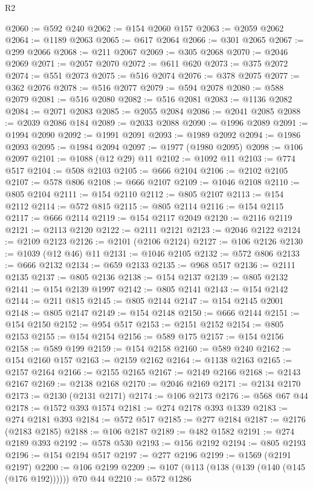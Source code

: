 \begin{lexlean}{R2}
\begin{coremodule}
@2060 := @592 @240
@2062 := @154 @2060 @157
@2063 := @2059 @2062
@2064 := @1189 @2063
@2065 := @617 @2064
@2066 := @301 @2065
@2067 := @299 @2066
@2068 := @211 @2067
@2069 := @305 @2068
@2070 := @2046 @2069
@2071 := @2057 @2070
@2072 := @611 @620
@2073 := @375 @2072
@2074 := @551 @2073
@2075 := @516 @2074
@2076 := @378 @2075
@2077 := @362 @2076
@2078 := @516 @2077
@2079 := @594 @2078
@2080 := @588 @2079
@2081 := @516 @2080
@2082 := @516 @2081
@2083 := @1136 @2082
@2084 := @2071 @2083
@2085 := @2055 @2084
@2086 := @2041 @2085
@2088 := @2039 @2086 @184
@2089 := @2033 @2088
@2090 := @1996 @2089
@2091 := @1994 @2090
@2092 := @1991 @2091
@2093 := @1989 @2092
@2094 := @1986 @2093
@2095 := @1984 @2094
@2097 := @1977 (@1980 @2095)
@2098 := @106 @2097
@2101 := @1088 (@12 @29) @11
@2102 := @1092 @11
@2103 := @774 @517
@2104 := @508 @2103
@2105 := @666 @2104
@2106 := @2102 @2105
@2107 := @578 @806
@2108 := @666 @2107
@2109 := @1046 @2108
@2110 := @805 @2104
@2111 := @154 @2110
@2112 := @805 @2107
@2113 := @154 @2112
@2114 := @572 @815
@2115 := @805 @2114
@2116 := @154 @2115
@2117 := @666 @2114
@2119 := @154 @2117 @2049
@2120 := @2116 @2119
@2121 := @2113 @2120
@2122 := @2111 @2121
@2123 := @2046 @2122
@2124 := @2109 @2123
@2126 := @2101 (@2106 @2124)
@2127 := @106 @2126
@2130 := @1039 (@12 @46) @11
@2131 := @1046 @2105
@2132 := @572 @806
@2133 := @666 @2132
@2134 := @659 @2133
@2135 := @968 @517
@2136 := @2111 @2135
@2137 := @805 @2136
@2138 := @154 @2137
@2139 := @805 @2132
@2141 := @154 @2139 @1997
@2142 := @805 @2141
@2143 := @154 @2142
@2144 := @211 @815
@2145 := @805 @2144
@2147 := @154 @2145 @2001
@2148 := @805 @2147
@2149 := @154 @2148
@2150 := @666 @2144
@2151 := @154 @2150
@2152 := @954 @517
@2153 := @2151 @2152
@2154 := @805 @2153
@2155 := @154 @2154
@2156 := @589 @175
@2157 := @154 @2156
@2158 := @589 @199
@2159 := @154 @2158
@2160 := @589 @240
@2162 := @154 @2160 @157
@2163 := @2159 @2162
@2164 := @1138 @2163
@2165 := @2157 @2164
@2166 := @2155 @2165
@2167 := @2149 @2166
@2168 := @2143 @2167
@2169 := @2138 @2168
@2170 := @2046 @2169
@2171 := @2134 @2170
@2173 := @2130 (@2131 @2171)
@2174 := @106 @2173
@2176 := @568 @67 @44
@2178 := @1572 @393 @1574
@2181 := @274 @2178 @393 @1339
@2183 := @274 @2181 @393
@2184 := @572 @517
@2185 := @277 @2184
@2187 := @2176 (@2183 @2185)
@2188 := @106 @2187
@2189 := @482 @1582
@2191 := @274 @2189 @393
@2192 := @578 @530
@2193 := @156 @2192
@2194 := @805 @2193
@2196 := @154 @2194 @517
@2197 := @277 @2196
@2199 := @1569 (@2191 @2197)
@2200 := @106 @2199
@2209 := @107 (@113 (@138 (@139 (@140 (@145 (@176 @192)))))) @70 @44
@2210 := @572 @1286

\end{coremodule}
\end{lexlean}
